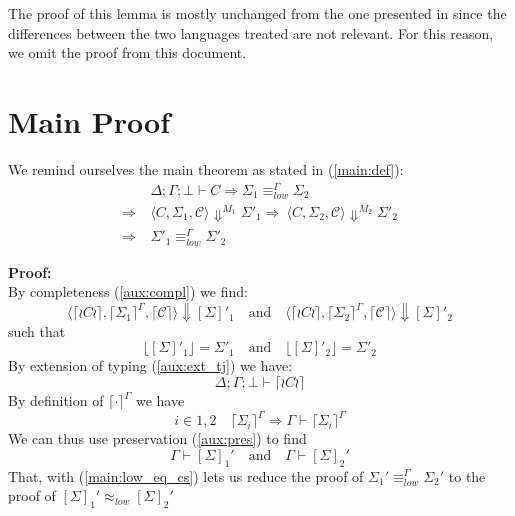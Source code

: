 \documentclass[12pt,a4paper,twoside]{book}
\begin{document}
The proof of this lemma is mostly unchanged from the one presented in \cite{myers2011proving} since the differences between the two languages treated are not relevant. For this reason, we omit the proof from this document.

\section{Main Proof}
We remind ourselves the main theorem as stated in (\ref{main:def}):
\begin{align*}
	&\Delta;\Gamma;\bot \vdash C \Rightarrow
	\Sigma_1 \equiv^\Gamma_{low} \Sigma_2 \\ \Rightarrow\ &\langle C, \Sigma_1, \mathscr{C}\rangle \Downarrow^{M_1} \Sigma'_1
	\Rightarrow\ \langle C, \Sigma_2, \mathscr{C}\rangle \Downarrow^{M_2} \Sigma'_2 \\ \Rightarrow\ &\Sigma'_1 \equiv^\Gamma_{low} \Sigma'_2
\end{align*}

\noindent\textbf{Proof:}\\
By completeness (\ref{aux:compl}) we find:
$$
	\langle \lceil \wr C \wr \rceil, \lceil \Sigma_1 \rceil^\Gamma, \lceil \mathscr{C}\rceil \rangle \Downarrow [\Sigma]'_1 \quad \text{and} \quad
	\langle \lceil \wr C \wr \rceil, \lceil \Sigma_2 \rceil^\Gamma, \lceil \mathscr{C}\rceil\rangle \Downarrow [\Sigma]'_2
$$
such that
\begin{equation}\label{main:low_eq_cs}
\lfloor [\Sigma]'_1 \rfloor = \Sigma'_1 \quad \text{and} \quad
\lfloor [\Sigma]'_2 \rfloor = \Sigma'_2
\end{equation}
By extension of typing (\ref{aux:ext_tj}) we have:
$$\Delta;\Gamma;\bot \vdash \lceil \wr C \wr \rceil$$
By definition of $\lceil \cdot \rceil^\Gamma$ we have
$$
i \in {1,2} \quad \lceil \Sigma_i \rceil^\Gamma \Rightarrow
\Gamma \vdash \lceil \Sigma_i \rceil^\Gamma
$$
We can thus use preservation (\ref{aux:pres}) to find
$$
\Gamma \vdash [\Sigma]_1' \quad \text{and} \quad \Gamma \vdash [\Sigma]_2'
$$
That, with (\ref{main:low_eq_cs}) lets us reduce the proof of $
\Sigma_1' \equiv_{low}^\Gamma \Sigma_2'$ to the proof of
$ [\Sigma]_1' \approx_{low} [\Sigma]_2' $
\end{document}
